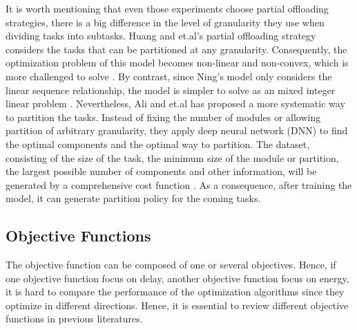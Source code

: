 \documentclass[a4paper,11pt]{article}
\begin{document}
It is worth mentioning that even those experiments choose partial offloading strategies, there is a big difference in the level of granularity they use when dividing tasks into subtasks. Huang and et.al's partial offloading strategy considers the tasks that can be partitioned at any granularity. Consequently, the optimization problem of this model becomes non-linear and non-convex, which is more challenged to solve \cite{Distributed_Offloading_in_Overlapping_Areas}. By contrast, since Ning's model only considers the linear sequence relationship, the model is simpler to solve as an mixed integer linear problem \cite{A_Cooperative_Partial_Computation_Offloading_Scheme_for_Mobile_Edge}. Nevertheless, Ali and et.al has proposed a more systematic way to partition the tasks. Instead of fixing the number of modules or allowing partition of arbitrary granularity, they apply deep neural network (DNN) to find the optimal components and the optimal way to partition. The dataset, consisting of the size of the task, the minimum size of the module or partition, the largest possible number of components and other information, will be generated by a comprehensive cost function \cite{granuity_2}. As a consequence, after training the model, it can generate partition policy for the coming tasks.\newline




\subsection{Objective Functions}
The objective function can be composed of one or several objectives. Hence, if one objective function focus on delay, another objective function focus on energy, it is hard to compare the performance of the optimization algorithms since they optimize in different directions. Hence, it is essential to review different objective functions in previous literatures.\newline
\end{document}
